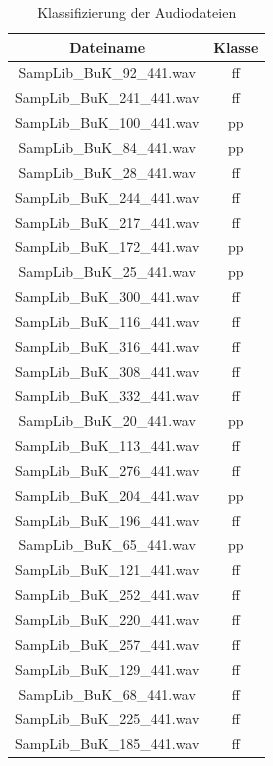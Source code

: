 \begin{table}[H]
\centering
\caption{Klassifizierung der Audiodateien}
\label{tab:T}

\hfill
\begin{minipage}[b]{0.4\textwidth}
  \begin{tabular}{ | c | c | }
    \hline
    Dateiname & Klasse \\
    \hline
    SampLib\_BuK\_92\_441.wav & ff \\
    SampLib\_BuK\_241\_441.wav & ff \\
    SampLib\_BuK\_100\_441.wav & pp \\
    SampLib\_BuK\_84\_441.wav & pp \\
    SampLib\_BuK\_28\_441.wav & ff \\
    SampLib\_BuK\_244\_441.wav & ff \\
    SampLib\_BuK\_217\_441.wav & ff \\
    SampLib\_BuK\_172\_441.wav & pp \\
    SampLib\_BuK\_25\_441.wav & pp \\
    SampLib\_BuK\_300\_441.wav & ff \\
    SampLib\_BuK\_116\_441.wav & ff \\
    SampLib\_BuK\_316\_441.wav & ff \\
    SampLib\_BuK\_308\_441.wav & ff \\
    SampLib\_BuK\_332\_441.wav & ff \\
    SampLib\_BuK\_20\_441.wav & pp \\
    SampLib\_BuK\_113\_441.wav & ff \\
    SampLib\_BuK\_276\_441.wav & ff \\
    SampLib\_BuK\_204\_441.wav & pp \\
    SampLib\_BuK\_196\_441.wav & ff \\
    SampLib\_BuK\_65\_441.wav & pp \\
    SampLib\_BuK\_121\_441.wav & ff \\
    SampLib\_BuK\_252\_441.wav & ff \\
    SampLib\_BuK\_220\_441.wav & ff \\
    SampLib\_BuK\_257\_441.wav & ff \\
    SampLib\_BuK\_129\_441.wav & ff \\
    SampLib\_BuK\_68\_441.wav & ff \\
    SampLib\_BuK\_225\_441.wav & ff \\
    SampLib\_BuK\_185\_441.wav & ff \\

\end{tabular}
\end{minipage}
\end{table}
